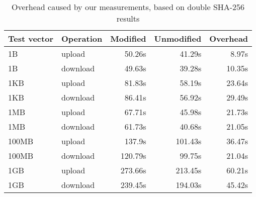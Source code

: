 \begin{table}
  \centering
  \caption{Overhead caused by our measurements, based on double SHA-256
    results}
  \begin{tabular}{ | l | l | r | r | r |}
    \hline
    \textbf{Test vector} & \textbf{Operation} & \textbf{Modified} & \textbf{Unmodified} & \textbf{Overhead} \\ \hline
    1B     &  upload    &  50.26s   &  41.29s   &  8.97s   \\  \hline
    1B     &  download  &  49.63s   &  39.28s   &  10.35s  \\  \hline
    1KB    &  upload    &  81.83s   &  58.19s   &  23.64s  \\  \hline
    1KB    &  download  &  86.41s   &  56.92s   &  29.49s  \\  \hline
    1MB    &  upload    &  67.71s   &  45.98s   &  21.73s  \\  \hline
    1MB    &  download  &  61.73s   &  40.68s   &  21.05s  \\  \hline
    100MB  &  upload    &  137.9s   &  101.43s  &  36.47s  \\  \hline
    100MB  &  download  &  120.79s  &  99.75s   &  21.04s  \\  \hline
    1GB    &  upload    &  273.66s  &  213.45s  &  60.21s  \\  \hline
    1GB    &  download  &  239.45s  &  194.03s  &  45.42s  \\  \hline
  \end{tabular}
  \label{tbl:measure:overhead}
\end{table}
